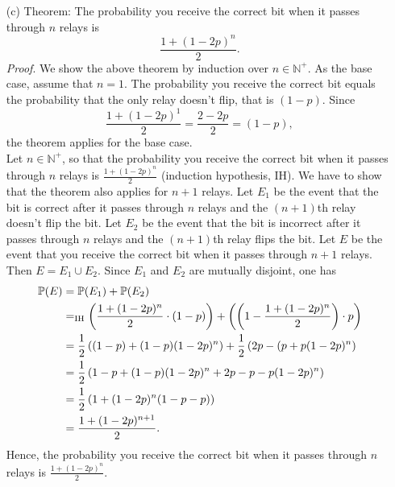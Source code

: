 \begin{enumerate}
   \item[(c)] Theorem: The probability you receive the correct bit when it passes
    through $n$ relays is
    \[ \frac{1 + (1 - 2p)^n}{2}. \]
    \textit{Proof}. We show the above theorem by induction over $n \in \mathbb{N}^+$.
    As the base case, assume that $n = 1$. The probability you receive the correct
    bit equals the probability that the only relay doesn't flip, that is $(1 - p)$.
    Since
    \[ \frac{1 + (1 - 2p)^1}{2} = \frac{2 - 2p}{2} = (1 - p), \]
    the theorem applies for the base case. \\
    Let $n \in \mathbb{N}^+$, so that the probability you receive the correct bit
    when it passes through $n$ relays is $\frac{1 + (1 - 2p)^n}{2}$ (induction
    hypothesis, IH). We have to show that the theorem also applies for $n+1$
    relays. Let $E_1$ be the event that the bit is correct after it passes through
    $n$ relays and the $(n+1)$th relay doesn't flip the bit. Let $E_2$ be the
    event that the bit is incorrect after it passes through $n$ relays and the
    $(n+1)$th relay flips the bit. Let $E$ be the event that you receive the correct
    bit when it passes through $n + 1$ relays. Then $E = E_1 \cup E_2$. Since
    $E_1$ and $E_2$ are mutually disjoint, one has
    \begin{align*}
      \mathbb{P}(E)
      &= \mathbb{P}(E_1) + \mathbb{P}(E_2) \\
      &=_{\text{IH}}  \left( \frac{1 + (1 - 2p)^n}{2} \cdot (1 - p) \right) +
        \left( \left( 1 - \frac{1 + (1 - 2p)^n}{2} \right) \cdot p \right) \\
      &= \frac{1}{2} \left( (1-p) + (1-p)(1 - 2p)^n \right) +
        \frac{1}{2} \left( 2p - (p + p(1 - 2p)^n \right) \\
      &= \frac{1}{2} \left( 1 - p + (1-p)(1 - 2p)^n + 2p - p - p(1 - 2p)^n \right) \\
      &= \frac{1}{2} \left( 1  + (1 - 2p)^n(1 - p - p) \right) \\
      &= \frac{1  + (1 - 2p)^{n+1}}{2}.
    \end{align*}
    Hence, the probability you receive the correct bit when it passes through $n$
    relays is $\frac{1 + (1 - 2p)^n}{2}$.
 \end{enumerate}
